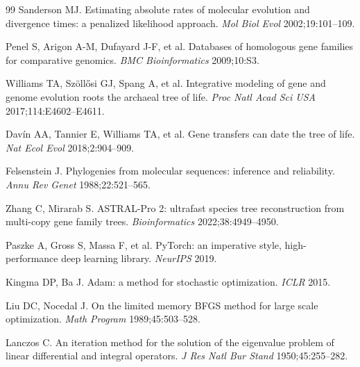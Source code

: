 \documentclass[11pt]{article}
\begin{document}
\begin{thebibliography}{99}
 Sanderson MJ. Estimating absolute rates of molecular
evolution and divergence times: a penalized likelihood approach.
\emph{Mol Biol Evol} 2002;19:101--109.

 Penel S, Arigon A-M, Dufayard J-F, et al. Databases of
homologous gene families for comparative genomics.
\emph{BMC Bioinformatics} 2009;10:S3.

 Williams TA, Sz\"oll\H{o}si GJ, Spang A, et al.
Integrative modeling of gene and genome evolution roots the archaeal tree of
life. \emph{Proc Natl Acad Sci USA} 2017;114:E4602--E4611.

 Dav\'in AA, Tannier E, Williams TA, et al. Gene transfers
can date the tree of life. \emph{Nat Ecol Evol} 2018;2:904--909.

 Felsenstein J. Phylogenies from molecular sequences:
inference and reliability. \emph{Annu Rev Genet} 1988;22:521--565.

 Zhang C, Mirarab S. ASTRAL-Pro 2: ultrafast species tree
reconstruction from multi-copy gene family trees.
\emph{Bioinformatics} 2022;38:4949--4950.

 Paszke A, Gross S, Massa F, et al. PyTorch: an imperative
style, high-performance deep learning library. \emph{NeurIPS} 2019.

 Kingma DP, Ba J. Adam: a method for stochastic
optimization. \emph{ICLR} 2015.

 Liu DC, Nocedal J. On the limited memory BFGS method
for large scale optimization. \emph{Math Program} 1989;45:503--528.

 Lanczos C. An iteration method for the solution of the
eigenvalue problem of linear differential and integral operators.
\emph{J Res Natl Bur Stand} 1950;45:255--282.

\end{thebibliography}
\end{document}
